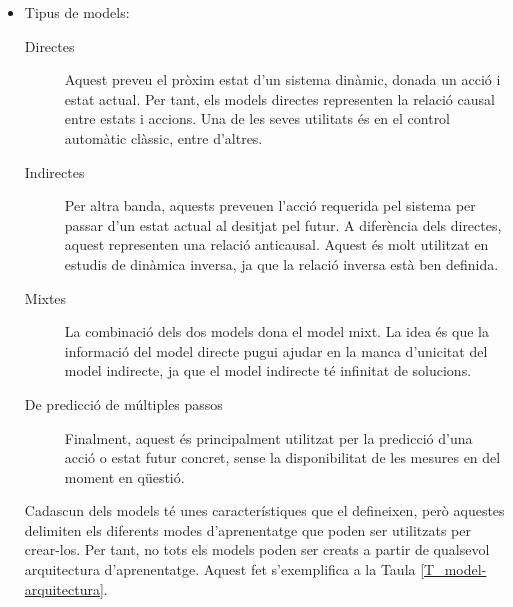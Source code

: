 \documentclass[12pt,a4paper,final,twoside]{report}
\begin{document}
\begin{itemize}
\item Tipus de models:

\begin{description}

\item[Directes] Aquest preveu el pròxim estat d'un sistema dinàmic, donada un acció i estat actual. Per tant, els models directes representen la relació causal entre estats i accions. Una de les seves utilitats és en el control automàtic clàssic, entre d'altres.

\item[Indirectes] Per altra banda, aquests preveuen l'acció requerida pel sistema per passar d'un estat actual al desitjat pel futur. A diferència dels directes, aquest representen una relació anticausal. Aquest és molt utilitzat en estudis de dinàmica inversa, ja que la relació inversa està ben definida.

\item[Mixtes] La combinació dels dos models dona el model mixt. La idea és que la informació del model directe pugui ajudar en la manca d'unicitat del model indirecte, ja que el model indirecte té infinitat de solucions. 

\item[De predicció de múltiples passos] Finalment, aquest és principalment utilitzat per la predicció d'una acció o estat futur concret, sense la disponibilitat de les mesures en del moment en qüestió.

\end{description}

Cadascun dels models té unes característiques que el defineixen, però aquestes delimiten els diferents modes d'aprenentatge que poden ser utilitzats per crear-los. Per tant, no tots els models poden ser creats a partir de qualsevol arquitectura d'aprenentatge. Aquest fet s'exemplifica a la Taula \ref{T_model-arquitectura}.

\end{itemize}
\end{document}
